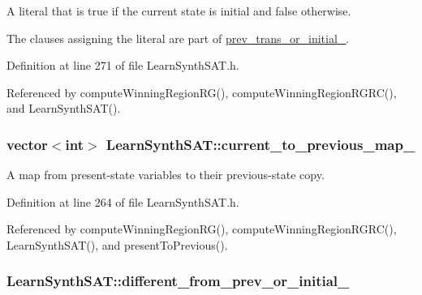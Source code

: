 A literal that is true if the current state is initial and false otherwise. 

The clauses assigning the literal are part of \hyperlink{classLearnSynthSAT_a6289a4f041ca85ce44a33143fab42888}{prev\-\_\-trans\-\_\-or\-\_\-initial\-\_\-}. 

Definition at line 271 of file Learn\-Synth\-S\-A\-T.\-h.



Referenced by compute\-Winning\-Region\-R\-G(), compute\-Winning\-Region\-R\-G\-R\-C(), and Learn\-Synth\-S\-A\-T().

\hypertarget{classLearnSynthSAT_a98f676db61a949cd9c9626e165f378a4}{
\subsubsection[{current\-\_\-to\-\_\-previous\-\_\-map\-\_\-}]{\setlength{\rightskip}{0pt plus 5cm}vector$<$int$>$ Learn\-Synth\-S\-A\-T\-::current\-\_\-to\-\_\-previous\-\_\-map\-\_\-\hspace{0.3cm}{\ttfamily [protected]}}}\label{classLearnSynthSAT_a98f676db61a949cd9c9626e165f378a4}


A map from present-\/state variables to their previous-\/state copy. 



Definition at line 264 of file Learn\-Synth\-S\-A\-T.\-h.



Referenced by compute\-Winning\-Region\-R\-G(), compute\-Winning\-Region\-R\-G\-R\-C(), Learn\-Synth\-S\-A\-T(), and present\-To\-Previous().

\hypertarget{classLearnSynthSAT_a1b0ed51f21b9fbb8cc0954e011968389}{
\subsubsection[{different\-\_\-from\-\_\-prev\-\_\-or\-\_\-initial\-\_\-}]{ Learn\-Synth\-S\-A\-T\-::different\-\_\-from\-\_\-prev\-\_\-or\-\_\-initial\-\_\-\hspace{0.3cm}{\ttfamily [protected]}}}\label{classLearnSynthSAT_a1b0ed51f21b9fbb8cc0954e011968389}


